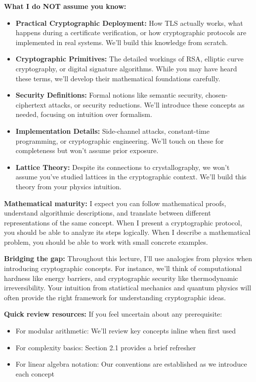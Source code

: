 \documentclass[11pt,a4paper]{article}
\begin{document}
\textbf{What I do NOT assume you know:}
\begin{itemize}
    \item \textbf{Practical Cryptographic Deployment:} How TLS actually works, what happens during a certificate verification, or how cryptographic protocols are implemented in real systems. We'll build this knowledge from scratch.
    
    \item \textbf{Cryptographic Primitives:} The detailed workings of RSA, elliptic curve cryptography, or digital signature algorithms. While you may have heard these terms, we'll develop their mathematical foundations carefully.
    
    \item \textbf{Security Definitions:} Formal notions like semantic security, chosen-ciphertext attacks, or security reductions. We'll introduce these concepts as needed, focusing on intuition over formalism.
    
    \item \textbf{Implementation Details:} Side-channel attacks, constant-time programming, or cryptographic engineering. We'll touch on these for completeness but won't assume prior exposure.
    
    \item \textbf{Lattice Theory:} Despite its connections to crystallography, we won't assume you've studied lattices in the cryptographic context. We'll build this theory from your physics intuition.
\end{itemize}

\textbf{Mathematical maturity:} I expect you can follow mathematical proofs, understand algorithmic descriptions, and translate between different representations of the same concept. When I present a cryptographic protocol, you should be able to analyze its steps logically. When I describe a mathematical problem, you should be able to work with small concrete examples.

\textbf{Bridging the gap:} Throughout this lecture, I'll use analogies from physics when introducing cryptographic concepts. For instance, we'll think of computational hardness like energy barriers, and cryptographic security like thermodynamic irreversibility. Your intuition from statistical mechanics and quantum physics will often provide the right framework for understanding cryptographic ideas.

\textbf{Quick review resources:} If you feel uncertain about any prerequisite:
\begin{itemize}
    \item For modular arithmetic: We'll review key concepts inline when first used
    \item For complexity basics: Section 2.1 provides a brief refresher
    \item For linear algebra notation: Our conventions are established as we introduce each concept
\end{itemize}
\end{document}
